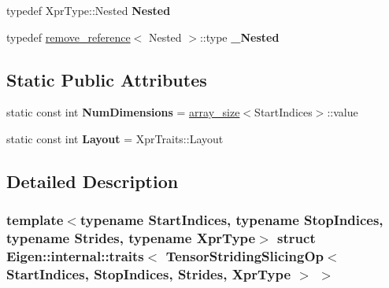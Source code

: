 \begin{DoxyCompactItemize}
typedef Xpr\+Type\+::\+Nested {\bfseries Nested}
\item 
\mbox{\label{struct_eigen_1_1internal_1_1traits_3_01_tensor_striding_slicing_op_3_01_start_indices_00_01_stop9ad1ed36f680305576abbd4a33c38a6e_a58a1c19d3e85738f8ecdfcef6c49c841}} 
typedef \hyperlink{struct_eigen_1_1internal_1_1remove__reference}{remove\+\_\+reference}$<$ Nested $>$\+::type {\bfseries \+\_\+\+Nested}
\end{DoxyCompactItemize}
\subsection*{Static Public Attributes}
\begin{DoxyCompactItemize}
\item 
\mbox{\label{struct_eigen_1_1internal_1_1traits_3_01_tensor_striding_slicing_op_3_01_start_indices_00_01_stop9ad1ed36f680305576abbd4a33c38a6e_aea8d546f5e57f9eabadb939f0d7b953f}} 
static const int {\bfseries Num\+Dimensions} = \hyperlink{struct_eigen_1_1internal_1_1array__size}{array\+\_\+size}$<$Start\+Indices$>$\+::value
\item 
\mbox{\label{struct_eigen_1_1internal_1_1traits_3_01_tensor_striding_slicing_op_3_01_start_indices_00_01_stop9ad1ed36f680305576abbd4a33c38a6e_a11ecc6ca3941a00e43f2833153ee3160}} 
static const int {\bfseries Layout} = Xpr\+Traits\+::\+Layout
\end{DoxyCompactItemize}


\subsection{Detailed Description}
\subsubsection*{template$<$typename Start\+Indices, typename Stop\+Indices, typename Strides, typename Xpr\+Type$>$\newline
struct Eigen\+::internal\+::traits$<$ Tensor\+Striding\+Slicing\+Op$<$ Start\+Indices, Stop\+Indices, Strides, Xpr\+Type $>$ $>$}



